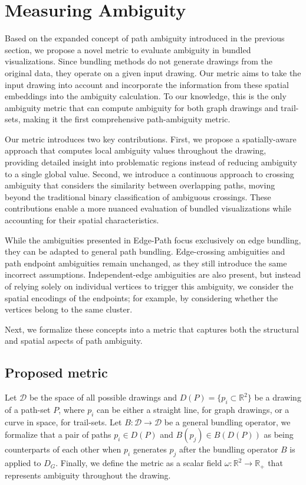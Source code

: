 
\section{Measuring Ambiguity}\label{sec:ambiguity}

Based on the expanded concept of path ambiguity introduced in the previous section, we propose a novel metric to evaluate ambiguity in bundled visualizations. Since bundling methods do not generate drawings from the original data, they operate on a given input drawing. Our metric aims to take the input drawing into account and incorporate the information from these spatial embeddings into the ambiguity calculation. To our knowledge, this is the only ambiguity metric that can compute ambiguity for both graph drawings and trail-sets, making it the first comprehensive path-ambiguity metric.

Our metric introduces two key contributions. First, we propose a spatially-aware approach that computes local ambiguity values throughout the drawing, providing detailed insight into problematic regions instead of reducing ambiguity to a single global value. Second, we introduce a continuous approach to crossing ambiguity that considers the similarity between overlapping paths, moving beyond the traditional binary classification of ambiguous crossings. These contributions enable a more nuanced evaluation of bundled visualizations while accounting for their spatial characteristics.

While the ambiguities presented in Edge-Path focus exclusively on edge bundling, they can be adapted to general path bundling. Edge-crossing ambiguities and path endpoint ambiguities remain unchanged, as they still introduce the same incorrect assumptions. Independent-edge ambiguities are also present, but instead of relying solely on individual vertices to trigger this ambiguity, we consider the spatial encodings of the endpoints; for example, by considering whether the vertices belong to the same cluster.

Next, we formalize these concepts into a metric that captures both the structural and spatial aspects of path ambiguity.


\subsection{Proposed metric}

Let $\mathcal{D}$ be the space of all possible drawings and $D(P) = \{p_i \subset \mathbb{R}^2 \}$ be a drawing of a path-set $P$, where $p_i$ can be either a straight line, for graph drawings, or a curve in space, for trail-sets. Let $B: \mathcal{D} \rightarrow \mathcal{D}$ be a general bundling operator, we formalize that a pair of paths $p_i \in D(P)$ and $B(p_j) \in B(D(P))$ as being counterparts of each other when $p_i$ generates $p_j$ after the bundling operator $B$ is applied to $D_G$. Finally, we define the metric as a scalar field $\omega : \mathbb{R}^2 \rightarrow \mathbb{R}_{+}$ that represents ambiguity throughout the drawing.


